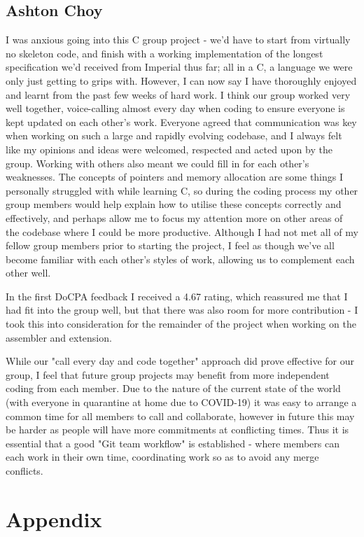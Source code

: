 \documentclass[11pt]{article}
\begin{document}
\subsection*{Ashton Choy}
I was anxious going into this C group project - we'd have to start from virtually no skeleton code, and finish with a working implementation of the longest specification we'd received from Imperial thus far; all in a C, a language we were only just getting to grips with. However, I can now say I have thoroughly enjoyed and learnt from the past few weeks of hard work. I think our group worked very well together, voice-calling almost every day when coding to ensure everyone is kept updated on each other's work. Everyone agreed that communication was key when working on such a large and rapidly evolving codebase, and I always felt like my opinions and ideas were welcomed, respected and acted upon by the group. Working with others also meant we could fill in for each other's weaknesses. The concepts of pointers and memory allocation are some things I personally struggled with while learning C, so during the coding process my other group members would help explain how to utilise these concepts correctly and effectively, and perhaps allow me to focus my attention more on other areas of the codebase where I could be more productive. Although I had not met all of my fellow group members prior to starting the project, I feel as though we've all become familiar with each other's styles of work, allowing us to complement each other well.

In the first DoCPA feedback I received a 4.67 rating, which reassured me that I had fit into the group well, but that there was also room for more contribution - I took this into consideration for the remainder of the project when working on the assembler and extension.

While our "call every day and code together" approach did prove effective for our group, I feel that future group projects may benefit from more independent coding from each member. Due to the nature of the current state of the world (with everyone in quarantine at home due to COVID-19) it was easy to arrange a common time for all members to call and collaborate, however in future this may be harder as people will have more commitments at conflicting times. Thus it is essential that a good "Git team workflow" is established - where members can each work in their own time, coordinating work so as to avoid any merge conflicts.
\newpage
\appendix
\section*{Appendix}
\end{document}
